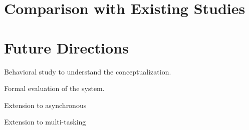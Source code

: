 
\section{Comparison with Existing Studies} %
\label{sec:comparison_with_existing_studies}


\section{Future Directions} %
\label{sec:future_directions}
Behavioral study to understand the conceptualization.

Formal evaluation of the system. 

Extension to asynchronous 

Extension to multi-tasking





 

